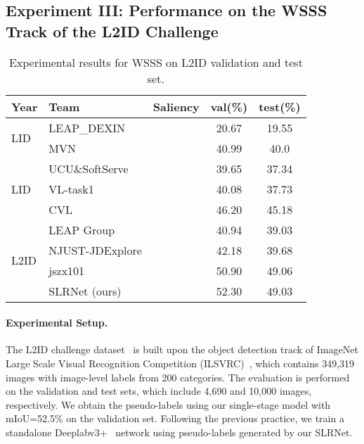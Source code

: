 \documentclass[twocolumn]{svjour3}          \smartqed  \usepackage{graphicx}
\newcommand{\prelim}[1]{{#1}}
\begin{document}
\subsection{Experiment III: Performance on the WSSS Track of the L2ID Challenge}
\begin{table}[!t]
    \begin{tabularx}{\linewidth}{@{}l|Xccc@{}}
    \toprule
    Year & Team & Saliency & val(\%) & {test(\%)}\\
\midrule
    \multirow{2}{*}{LID} & LEAP\_DEXIN&  & 20.67 & 19.55\\
    & MVN &  & 40.99& 40.0\\
    \midrule 
\multirow{3}{*}{LID} & UCU\&SoftServe &  & 39.65 & 37.34 \\
    & VL-task1 & & 40.08 & 37.73  \\
    & CVL & & 46.20 & 45.18   \\
    \midrule
\multirow{4}{*}{L2ID} &{LEAP Group} & & 40.94& 39.03 \\
    &\scriptsize{NJUST-JDExplore} & & 42.18 & 39.68 \\ 
    &jszx101 & & 50.90 & 49.06 \\
& SLRNet (ours) &  & {52.30}   & {49.03} \\
    \bottomrule
    \end{tabularx}
    \caption{Experimental results for WSSS on L2ID validation and test set.}
    \label{table:lid_result}
  \end{table}
  
  \paragraph{Experimental Setup.}
    The L2ID challenge dataset~\citep{YunchaoWei2020:lid20} is built upon the object detection track of ImageNet Large Scale Visual Recognition Competition (ILSVRC)~\citep{DengDSLL009:imagenet}, which contains 349,319 images with image-level labels from 200 categories.
    \prelim{
    The evaluation is performed on the validation and test sets, which include 4,690 and 10,000 images, respectively.
    }
    We obtain the pseudo-labels using our single-stage model with  mIoU=52.5\% on the validation set.
    Following the previous practice, we train a standalone Deeplabv3+~\citep{deeplabv3plus2018} network using pseudo-labels generated by our SLRNet.
\end{document}
